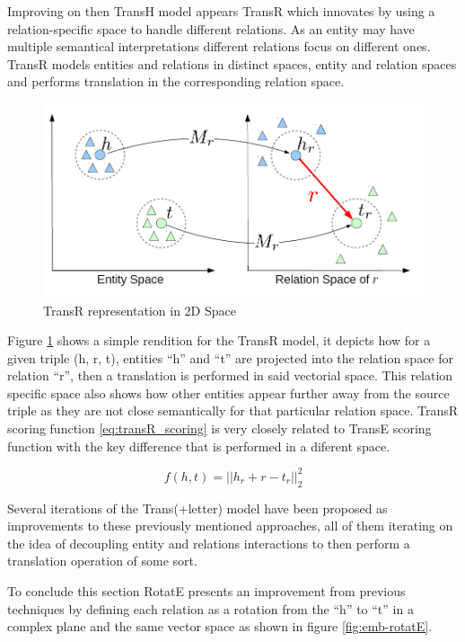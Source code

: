 Improving on then TransH model appears TransR\cite{} which innovates by using a relation-specific space to handle different relations. As an entity may have multiple semantical interpretations different relations focus on different ones. TransR models entities and relations in distinct spaces, entity and relation spaces and performs translation in the corresponding relation space.

\begin{figure}[!htp]
    \centering
    \includegraphics[width=.7\textwidth]{fig/embeddings/TransR.png}
    \caption{TransR representation in 2D Space}
    \label{fig:emb-transR}
\end{figure}

Figure \ref{fig:emb-transR} shows a simple rendition for the TransR model, it depicts how for a given triple (h, r, t), entities ``h'' and ``t'' are projected into the relation space for relation ``r'', then a translation is performed in said vectorial space. This relation specific space also shows how other entities appear further away from the source triple as they are not close semantically for that particular relation space. TransR scoring function \ref{eq:transR_scoring} is very closely related to TransE scoring function with the key difference that is performed in a diferent space.

\begin{equation}
    \label{eq:transR_scoring}
    f(h, t) = ||h_r + r - t_r||^2_2
\end{equation}

Several iterations of the Trans(+letter) model have been proposed as improvements to these previously mentioned approaches, all of them iterating on the idea of decoupling entity and relations interactions to then perform a translation operation of some sort.

To conclude this section RotatE\cite{} presents an improvement from previous techniques by defining each relation as a rotation from the ``h'' to ``t'' in a complex plane and the same vector space as shown in figure \ref{fig:emb-rotatE}.

